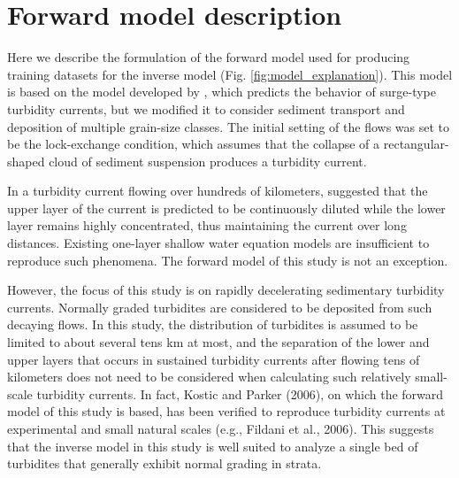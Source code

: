 
\section{Forward model description}

Here we describe the formulation of the forward model used for producing training datasets for the inverse model (Fig. \ref{fig:model_explanation}). This model is based on the model developed by \citet{kostic2006response}, which predicts the behavior of surge-type turbidity currents, but we modified it to consider sediment transport and deposition of multiple grain-size classes. The initial setting of the flows was set to be the lock-exchange condition, which assumes that the collapse of a rectangular-shaped cloud of sediment suspension produces a turbidity current.

In a turbidity current flowing over hundreds of kilometers, \citep{Luchi2018} suggested that the upper layer of the current is predicted to be continuously diluted while the lower layer remains highly concentrated, thus maintaining the current over long distances. Existing one-layer shallow water equation models are insufficient to reproduce such phenomena. The forward model of this study is not an exception.

However, the focus of this study is on rapidly decelerating sedimentary turbidity currents. Normally graded turbidites are considered to be deposited from such decaying flows. In this study, the distribution of turbidites is assumed to be limited to about several tens km at most, and the separation of the lower and upper layers that occurs in sustained turbidity currents after flowing tens of kilometers does not need to be considered when calculating such relatively small-scale turbidity currents. In fact, Kostic and Parker (2006), on which the forward model of this study is based, has been verified to reproduce turbidity currents at experimental and small natural scales (e.g., Fildani et al., 2006). This suggests that the inverse model in this study is well suited to analyze a single bed of turbidites that generally exhibit normal grading in strata.


